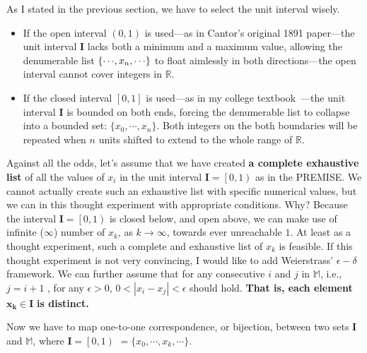 \documentclass[12pt]{article}
\theoremstyle{definition} %
\numberwithin{equation}{section}
\begin{document}
\vspace{1em}
\noindent As I stated in the previous section, we have to select the unit interval wisely. 

\begin{itemize}
\item If the open interval \(\left(0, 1\right)\) is used—as in Cantor’s original 1891 paper—the unit interval \(\bm{I}\) lacks both a minimum and a maximum value, allowing the denumerable list \(\{\textcolor{blue}{\cdots}, x_n, \textcolor{blue}{\cdots} \}\) to float aimlessly in both directions—the open interval cannot cover integers in \(\mathbb{R}\).

\item If the closed interval \(\left[0, 1\right]\) is used—as in my college textbook~\cite{lipschutz1998}—the unit interval \(\bm{I}\) is bounded on both ends, forcing the denumerable list to collapse into a bounded set: \(\{x_0,\cdots, x_n\}\). Both integers on the both boundaries will be repeated when \(n\) units shifted to extend to the whole range of \(\mathbb{R}\). 
\end{itemize}

Against all the odds, let's assume that we have created \textbf{a complete exhaustive list} of all the values of \(x_i\) in the unit interval \(\bm{I} = \left[0, 1\right)\) as in the PREMISE. We cannot actually create such an exhaustive list with specific numerical values, but we can in this thought experiment with appropriate conditions. Why? Because the interval \(\bm{I} = \left[0, 1\right)\) is closed below, and open above, we can make use of infinite (\(\infty\)) number of \(x_k\), as \(k \to \infty\), towards ever unreachable \(1\). At least as a thought experiment, such a complete and exhaustive list of \(x_k\) is feasible.
 If this thought experiment is not very convincing, I would like to add Weierstrass' \(\epsilon-\delta\) framework. We can further assume that for any consecutive \(i\) and \(j\) in \(\mathbb{M}\), i.e., \(j = i+1 \) ,  for any \(\epsilon > 0\), \(0 < |x_i - x_j| < \epsilon\) should hold. \textbf{That is, each element} \(\bm{x_k} \in \bm{I}\) \textbf{is distinct.}

\vspace{1em}
Now we have to map one-to-one correspondence, or bijection, between  two sets \(\bm{I}\) and \(\mathbb{M}\), where \(\bm{I} = \left[0, 1\right)\) \( = \{x_0, \cdots, x_k, \cdots\}\).
\end{document}
